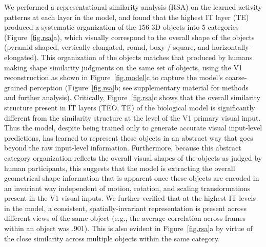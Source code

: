 \documentclass[12pt,twoside]{article}
\newif\myifpdf
\begin{document}
We performed a representational similarity analysis (RSA) on the learned activity patterns at each layer in the model, and found that the highest IT layer (TE) produced a systematic organization of the 156 3D objects into 5 categories (Figure~\ref{fig.rsa}a), which visually correspond to the overall shape of the objects (pyramid-shaped, vertically-elongated, round, boxy / square, and horizontally-elongated). This organization of the objects matches that produced by humans making shape similarity judgments on the same set of objects, using the V1 reconstruction as shown in Figure~\ref{fig.model}c to capture the model's coarse-grained perception (Figure~\ref{fig.rsa}b; see supplementary material for methods and further analysis).  Critically, Figure~\ref{fig.rsa}c shows that the overall similarity structure present in IT layers (TEO, TE) of the biological model is significantly different from the similarity structure at the level of the V1 primary visual input.  Thus the model, despite being trained only to generate accurate visual input-level predictions, has learned to represent these objects in an abstract way that goes beyond the raw input-level information.  Furthermore, because this abstract category organization reflects the overall visual shapes of the objects as judged by human participants, this suggests that the model is extracting the overall geometrical shape information that is apparent once these objects are encoded in an invariant way independent of motion, rotation, and scaling transformations present in the V1 visual inputs.  We further verified that at the highest IT levels in the model, a consistent, spatially-invariant representation is present across different views of the same object (e.g., the average correlation across frames within an object was .901).  This is also evident in Figure~\ref{fig.rsa}a by virtue of the close similarity across multiple objects within the same category.

\end{document}
